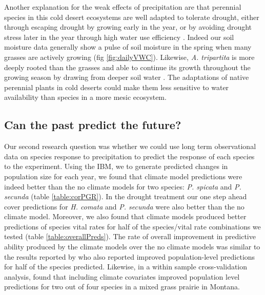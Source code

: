 \documentclass[11pt]{article}
\begin{document}
\begin{doublespace}
Another explanation for the weak effects of precipitation are that perennial species in this cold desert ecosystems are well adapted to tolerate drought, either through escaping drought by growing early in the year, or by avoiding drought stress later in the year through high water use efficiency \citep{bazzaz_physiological_1979,franks_plasticity_2011}. Indeed our soil moisture data generally show a pulse of soil moisture in the spring when many grasses are actively growing (fig \ref{fig:dailyVWC}). Likewise, \textit{A. tripartita} is more deeply rooted than the grasses and able to continue its growth throughout the growing season by drawing from deeper soil water \citep{germino_desert_2014}. The adaptations of native perennial plants in cold deserts could make them less sensitive to water availability than species in a more mesic ecosystem. 

\subsection*{Can the past predict the future?}
Our second research question was whether we could use long term observational data on species response to precipitation to predict the response of each species to the experiment. Using the IBM, we to generate predicted changes in population size for each year, we found that climate model predictions were indeed better than the no climate models for two species: \textit{P. spicata} and \textit{P. secunda} (table \ref{table:corPGR}). In the drought treatment our one step ahead cover predictions for \textit{H. comata} and \textit{P. secunda} were also better than the no climate model. Moreover, we also found that climate models produced better predictions of species vital rates for half of the species/vital rate combinations we tested (table \ref{table:overallPreds}). The rate of overall improvement in predictive ability produced by the climate models over the no climate models was similar to the results reported by \citep{adler_can_2013} who also reported improved population-level predictions for half of the species predicted. Likewise, in a within sample cross-validation analysis, \citep{tredennick_we_2016} found that including climate covariates improved population level predictions for two out of four species in a mixed grass prairie in Montana.  


\end{doublespace}
\end{document}
